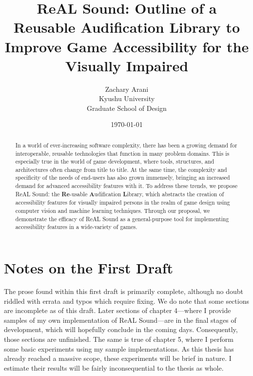 \documentclass{report}
\newcommand{\rs}{ReAL Sound\xspace}
\newcommand{\rsfull}{\textbf{Re}-usable \textbf{A}udification \textbf{L}ibrary\xspace}
\begin{document}

\author{Zachary Arani \\ Kyushu University \\ Graduate School of Design} %
\title{ReAL Sound: Outline of a Reusable Audification Library to Improve Game Accessibility for the Visually Impaired} 
\date{\today{}} 
\maketitle{} 


\begin{abstract}
    In a world of ever-increasing software complexity, there has been a growing demand for interoperable, reusable technologies that function in many problem domains. This is especially true in the world of game development, where tools, structures, and architectures often change from title to title. At the same time, the complexity and specificity of the needs of end-users has also grown immensely, bringing an increased demand for advanced accessibility features with it. To address these trends, we propose \rs: the \rsfull, which abstracts the creation of accessibility features for visually impaired persons in the realm of game design using computer vision and machine learning techniques. Through our proposal, we demonstrate the efficacy of \rs as a general-purpose tool for implementing accessibility features in a wide-variety of games.  
\end{abstract}

\newpage{} %


\chapter{Notes on the First Draft}
The prose found within this first draft is primarily complete, although no doubt riddled with errata and typos which require fixing. We do note that some sections are incomplete as of this draft. Later sections of chapter 4---where I provide samples of my own implementation of \rs---are in the final stages of development, which will hopefully conclude in the coming days. Consequently, those sections are unfinished. The same is true of chapter 5, where I perform some basic experiments using my sample implementations. As this thesis has already reached a massive scope, these experiments will be brief in nature. I estimate their results will be fairly inconsequential to the thesis as whole. 
\end{document}
